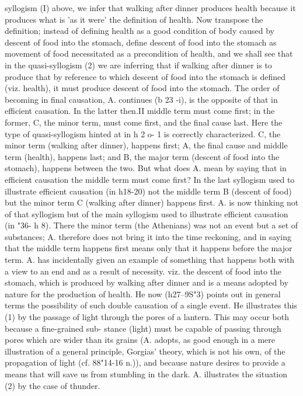 {{{{{{{{{{{{{{{{{{{{{{{{{{{{{{{{{{{{{{{{{{{{{{{{{{{{{{{{{{{syllogism (I) above, we infer that walking after dinner produces
health because it produces what is 'as it were' the definition of
health. Now transpose the definition; instead of defining health
as a good condition of body caused by descent of food into the
stomach, define descent of food into the stomach as movement
of food necessitated as a precondition of health, and we shall see
that in the quasi-syllogism (2) we are inferring that if walking
after dinner is to produce that by reference to which descent of
food into the stomach is defined (viz. health), it must produce
descent of food into the stomach.
The order of becoming in final causation, A. continues (b 23 -{i),
is the opposite of that in efficient causation. In the latter then.II
middle term must come first; in the former, C, the minor term,
must come first, and the final cause last. Here the type of
quasi-syllogism hinted at in h 2 o- 1 is correctly characterized. C,
the minor term (walking after dinner), happens first; A, the final
cause and middle term (health), happens last; and B, the major
term (descent of food into the stomach), happens between the
two. But what does A. mean by saying that in efficient causation
the middle term must come first? In the last syllogism used to
illustrate efficient causation (in h18-20) not the middle term B
(descent of food) but the minor term C (walking after dinner)
happens first. A. is now thinking not of that syllogism but of
the main syllogism used to illustrate efficient causation (in
"36- h 8). There the minor term (the Athenians) was not an event
but a set of substances; A. therefore does not bring it into the
time reckoning, and in saying that the middle term happens first
means only that it happens before the major term.
A. has incidentally given an example of something that
happens both with a view to an end and as a result of necessity.
viz. the descent of food into the stomach, which is produced by
walking after dinner and is a means adopted by nature for the
production of health. He now (h27--9S"3) points out in general
terms the possibility of such double causation of a single event.
He illustrates this (1) by the passage of light through the pores
of a lantern. This may occur both because a fine-grained sub-
stance (light) must be capable of passing through pores which
are wider than its grains (A. adopts, as good enough in a mere
illustration of a general principle, Gorgias' theory, which is not
his own, of the propagation of light (cf. 88"14-16 n.)), and because
nature desires to provide a means that will save us from stumbling
in the dark. A. illustrates the situation (2) by the case of thunder.
}}}}}}}}}}}}}}}}}}}}}}}}}}}}}}}}}}}}}}}}}}}}}}}}}}}}}}}}}}}}
